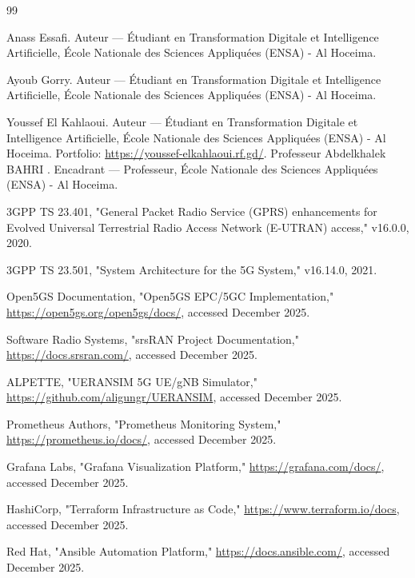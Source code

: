 \documentclass[12pt,a4paper]{report}
\begin{document}


\begin{thebibliography}{99}


 Anass Essafi. Auteur — Étudiant en Transformation Digitale et Intelligence Artificielle, École Nationale des Sciences Appliquées (ENSA) - Al Hoceima.

 Ayoub Gorry. Auteur — Étudiant en Transformation Digitale et Intelligence Artificielle, École Nationale des Sciences Appliquées (ENSA) - Al Hoceima.

 Youssef El Kahlaoui. Auteur — Étudiant en Transformation Digitale et Intelligence Artificielle, École Nationale des Sciences Appliquées (ENSA) - Al Hoceima. Portfolio:
\url{https://youssef-elkahlaoui.rf.gd/}.
 Professeur Abdelkhalek BAHRI . Encadrant — Professeur, École Nationale des Sciences Appliquées (ENSA) - Al Hoceima.


 3GPP TS 23.401, "General Packet Radio Service (GPRS) enhancements for Evolved Universal Terrestrial Radio Access Network (E-UTRAN) access," v16.0.0, 2020.

 3GPP TS 23.501, "System Architecture for the 5G System," v16.14.0, 2021.

 Open5GS Documentation, "Open5GS EPC/5GC Implementation," \url{https://open5gs.org/open5gs/docs/}, accessed December 2025.

 Software Radio Systems, "srsRAN Project Documentation," \url{https://docs.srsran.com/}, accessed December 2025.

 ALPETTE, "UERANSIM 5G UE/gNB Simulator," \url{https://github.com/aligungr/UERANSIM}, accessed December 2025.

 Prometheus Authors, "Prometheus Monitoring System," \url{https://prometheus.io/docs/}, accessed December 2025.

 Grafana Labs, "Grafana Visualization Platform," \url{https://grafana.com/docs/}, accessed December 2025.

 HashiCorp, "Terraform Infrastructure as Code," \url{https://www.terraform.io/docs}, accessed December 2025.

 Red Hat, "Ansible Automation Platform," \url{https://docs.ansible.com/}, accessed December 2025.


\end{thebibliography}
\end{document}
